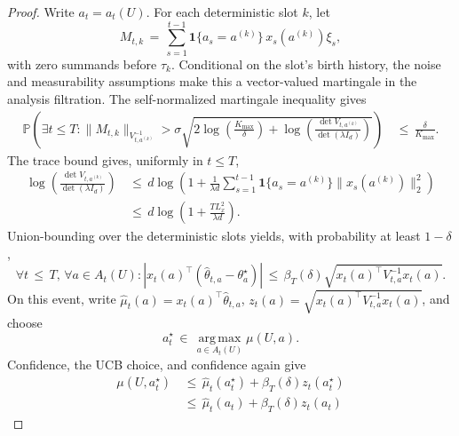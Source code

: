 \documentclass{article} %
\begin{document}
\begin{proof}
Write \(a_t=a_t(U)\).  For each deterministic slot \(k\), let
\begin{equation}
M_{t,k}
\,=\,
\sum_{s=1}^{t-1}
\mathbf{1}\{a_s=a^{(k)}\}\,x_s(a^{(k)})\xi_s,
\end{equation}
with zero summands before \(\tau_k\).  Conditional on the slot's birth history,
the noise and measurability assumptions make this a vector-valued martingale
in the analysis filtration.  The
self-normalized martingale inequality gives
\begin{equation}
\begin{aligned}
\mathbb{P}\!\left(
\exists t\leq T:
\|M_{t,k}\|_{V_{t,a^{(k)}}^{-1}}
>
\sigma
\sqrt{
2\log\!\left(\frac{K_{\max}}{\delta}\right)
+
\log\!\left(\frac{\det V_{t,a^{(k)}}}{\det(\lambda I_d)}\right)
}
\right)
&\,\leq\,
\frac{\delta}{K_{\max}}.
\end{aligned}
\end{equation}
The trace bound gives, uniformly in \(t\leq T\),
\begin{equation}
\begin{aligned}
\log\!\left(\frac{\det V_{t,a^{(k)}}}{\det(\lambda I_d)}\right)
&\,\leq\,
d\log\!\left(
1+
\frac{1}{\lambda d}
\sum_{s=1}^{t-1}
\mathbf{1}\{a_s=a^{(k)}\}\|x_s(a^{(k)})\|_2^2
\right)
\\
&\,\leq\,
d\log\!\left(
1+\frac{T L_x^2}{\lambda d}
\right).
\end{aligned}
\end{equation}
Union-bounding over the deterministic slots yields, with probability at least
\(1-\delta\),
\begin{equation}
\forall t\,\le\, T,\,
\forall a\in A_t(U):
\left|
x_t(a)^\top(\widehat{\theta}_{t,a}-\theta_a^\star)
\right|
\,\leq\,
\beta_T(\delta)
\sqrt{x_t(a)^\top V_{t,a}^{-1}x_t(a)}.
\end{equation}
On this event, write
\(\widehat\mu_t(a)=x_t(a)^\top\widehat\theta_{t,a}\),
\(z_t(a)=\sqrt{x_t(a)^\top V_{t,a}^{-1}x_t(a)}\), and choose
\begin{equation}
a_t^\star
\,\in\,
\operatorname*{arg\,max}_{a\in A_t(U)}\mu(U,a).
\end{equation}
Confidence, the UCB choice, and confidence again give
\begin{equation}
\begin{aligned}
\mu(U,a_t^\star)
&\,\leq\,
\widehat{\mu}_t(a_t^\star)
+
\beta_T(\delta)z_t(a_t^\star)
\\
&\,\leq\,
\widehat{\mu}_t(a_t)
+
\beta_T(\delta)z_t(a_t)

\end{aligned}
\end{equation}
\end{proof}
\end{document}
